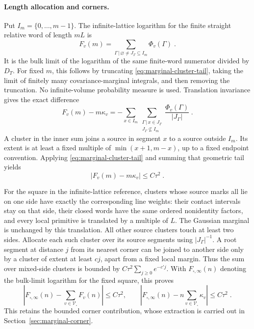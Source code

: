 \documentclass[11pt]{article}
\begin{document}
\paragraph{Length allocation and corners.}
Put $I_m=\{0,\ldots,m-1\}$. The infinite-lattice logarithm for the finite straight relative word of length $mL$ is
\begin{equation}\label{eq:marginal-finite-line-log}
    F_v(m)=\sum_{\Gamma\, | \,\varnothing\ne J_\Gamma\subseteq I_m}
        \Phi_v(\Gamma)\;.
\end{equation}
It is the bulk limit of the logarithm of the same finite-word numerator divided by $D_T$. For fixed $m$, this follows by truncating \eqref{eq:marginal-cluster-tail}, taking the limit of finitely many covariance-marginal integrals, and then removing the truncation. No infinite-volume probability measure is used. Translation invariance gives the exact difference
\begin{equation}\label{eq:marginal-line-endpoints}
    F_v(m)-m\kappa_v
        =-\sum_{x\in I_m}
            \sum_{\substack{\Gamma\, | \,x\in J_\Gamma\\
                                      J_\Gamma\not \subseteq I_m}}
                \frac{\Phi_v(\Gamma)}{|J_\Gamma|}\;.
\end{equation}
A cluster in the inner sum joins a source in segment $x$ to a source outside $I_m$. Its extent is at least a fixed multiple of $\min(x+1,m-x)$, up to a fixed endpoint convention. Applying \eqref{eq:marginal-cluster-tail} and summing that geometric tail yields
\begin{equation}\label{eq:marginal-line-density-limit}
    |F_v(m)-m\kappa_v|\leq C\tau^2\;.
\end{equation}

For the square in the infinite-lattice reference, clusters whose source marks all lie on one side have exactly the corresponding line weights: their contact intervals stay on that side, their closed words have the same ordered nonidentity factors, and every local primitive is translated by a multiple of $L$. The Gaussian marginal is unchanged by this translation. All other source clusters touch at least two sides. Allocate each such cluster over its source segments using $|J_\Gamma|^{-1}$. A root segment at distance $j$ from its nearest corner can be joined to another side only by a cluster of extent at least $cj$, apart from a fixed local margin. Thus the sum over mixed-side clusters is bounded by $C\tau^2\sum_{j\geq 0}e^{-c'j}$. With $F_{\square,\infty}(n)$ denoting the bulk-limit logarithm for the fixed square, this proves
\begin{equation}\label{eq:marginal-square-corners}
    \left|F_{\square,\infty}(n)
        -\sum_{v\in \mathscr V_\square}F_v(n)\right|
        \leq C\tau^2,
    \qquad
    \left|F_{\square,\infty}(n)
        -n\sum_{v\in \mathscr V_\square}\kappa_v\right|
        \leq C\tau^2\;.
\end{equation}
This retains the bounded corner contribution, whose extraction is carried out in Section~\ref{sec:marginal-corner}.
\end{document}
